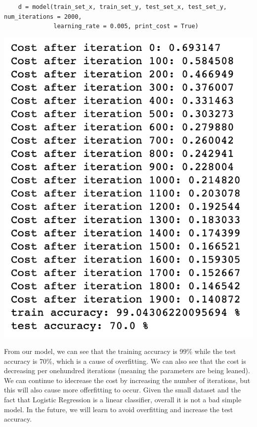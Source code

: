 \documentclass[11pt, a4paper]{article}
\begin{document}
\begin{spacing}{1.1}
\begin{lstlisting}
	d = model(train_set_x, train_set_y, test_set_x, test_set_y, num_iterations = 2000, 
	          learning_rate = 0.005, print_cost = True) \end{lstlisting} \vspace*{1mm}
	\begin{minipage}[c]{6cm}
	\includegraphics[scale=0.4]{model_output}
	\end{minipage}
	\begin{minipage}[c]{11cm}
	From our model, we can see that the training accuracy is 99\% while the test accuracy is 70\%, which is a cause of overfitting. We can also see that the cost is decreasing per onehundred iterations (meaning the parameters are being leaned). We can continue to idecrease the cost by increasing the number of iterations, but this will also cause more offerfitting to occur. Given the small dataset and the fact that Logistic Regression is a linear classifier, overall it is not a bad simple model. In the future, we will learn to avoid overfitting and increase the test accuracy.
	\end{minipage} \newpage


\end{spacing}
\end{document}
